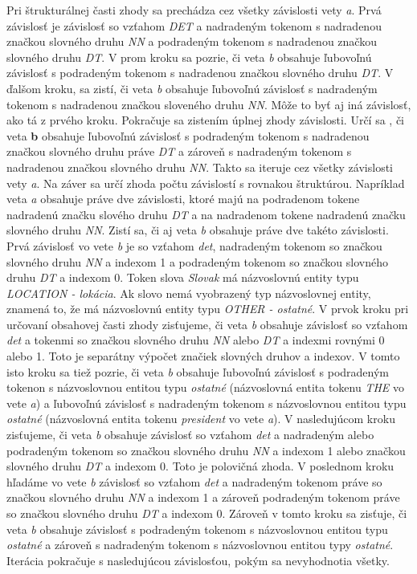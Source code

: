 Pri štrukturálnej časti zhody sa prechádza cez všetky závislosti vety \textit{a}. Prvá závislosť je závislosť so vzťahom \textit{DET} a nadradeným tokenom s nadradenou značkou slovného druhu \textit{NN} a podradeným tokenom s nadradenou značkou slovného druhu \textit{DT}. V prom kroku sa pozrie, či veta \textit{b} obsahuje ľubovoľnú závislosť s podradeným tokenom s nadradenou značkou slovného druhu \textit{DT}. V ďalšom kroku, sa zistí, či veta \textit{b} obsahuje ľubovoľnú závislosť s nadradeným tokenom s nadradenou značkou sloveného druhu \textit{NN}. Môže to byť aj iná závislosť, ako tá z prvého kroku. Pokračuje sa zistením úplnej zhody závislosti. Určí sa , či veta \textbf{b} obsahuje ľubovoľnú závislosť s podradeným tokenom s nadradenou značkou slovného druhu práve \textit{DT} a zároveň s nadradeným tokenom s nadradenou značkou slovného druhu \textit{NN}. Takto sa iteruje cez všetky závislosti vety \textit{a}. Na záver sa určí zhoda počtu závislostí s rovnakou štruktúrou. Napríklad veta \textit{a} obsahuje práve dve závislosti, ktoré majú na podradenom tokene nadradenú značku slového druhu \textit{DT} a na nadradenom tokene nadradenú značku slovného druhu \textit{NN}. Zistí sa, či aj veta \textit{b} obsahuje práve dve takéto závislosti. \\

Prvá závislosť vo vete \textit{b} je so vzťahom \textit{det}, nadradeným tokenom so značkou slovného druhu \textit{NN} a indexom 1 a podradeným tokenom so značkou slovného druhu \textit{DT} a indexom 0. Token slova \textit{Slovak} má názvoslovnú entity typu \textit{LOCATION - lokácia}. Ak slovo nemá vyobrazený typ názvoslovnej entity, znamená to, že má názvoslovnú entity typu \textit{OTHER - ostatné}. V prvok kroku pri určovaní obsahovej časti zhody zisťujeme, či veta \textit{b} obsahuje závislosť so vzťahom \textit{det} a tokenmi so značkou slovného druhu \textit{NN} alebo \textit{DT} a indexmi rovnými 0 alebo 1. Toto je separátny výpočet značiek slovných druhov a indexov. V tomto isto kroku sa tiež pozrie, či veta \textit{b} obsahuje ľubovoľnú závislosť s podradeným tokenon s názvoslovnou entitou typu \textit{ostatné} (názvoslovná entita tokenu \textit{THE} vo vete \textit{a}) a ľubovoľnú závislosť s nadradeným tokenom s názvoslovnou entitou typu \textit{ostatné} (názvoslovná entita tokenu \textit{president} vo vete \textit{a}). V nasledujúcom kroku zisťujeme, či veta \textit{b} obsahuje závislosť so vzťahom \textit{det} a nadradeným alebo podradeným tokenom so značkou slovného druhu \textit{NN} a indexom 1 alebo značkou slovného druhu \textit{DT} a indexom 0. Toto je polovičná zhoda. V poslednom kroku hľadáme vo vete \textit{b} závislosť so vzťahom \textit{det} a nadradeným tokenom práve so značkou slovného druhu \textit{NN} a indexom 1 a zároveň podradeným tokenom práve so značkou slovného druhu \textit{DT} a indexom 0. Zároveň v tomto kroku sa zisťuje, či veta \textit{b} obsahuje závislosť s podradeným tokenom s názvoslovnou entitou typu \textit{ostatné} a zároveň s nadradeným tokenom s názvoslovnou entitou typy \textit{ostatné}. Iterácia pokračuje s nasledujúcou závislosťou, pokým sa nevyhodnotia všetky. \\

